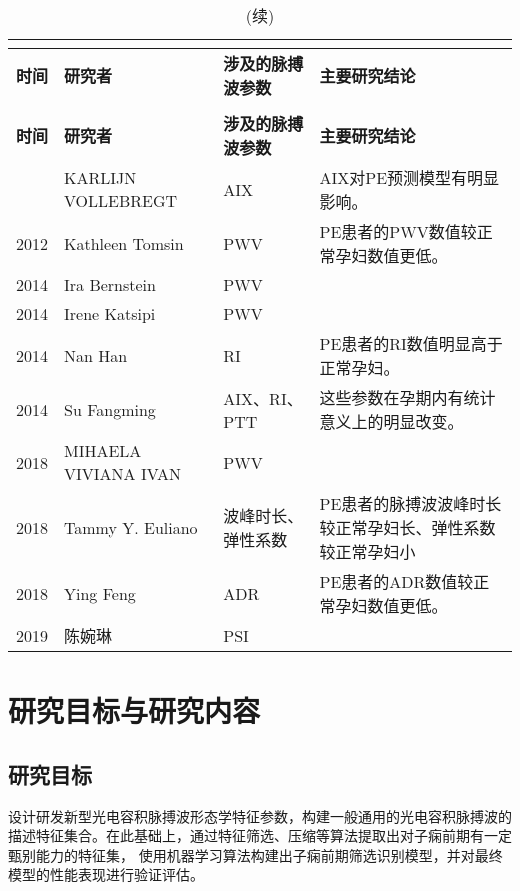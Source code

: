 \begin{center}
	\begin{longtable}{m{1cm}<{\centering}m{3cm}<{\centering}m{3cm}<{\centering}m{7cm}<{\centering}}
		\caption{基于脉搏波的PE研究小结}\\
		\label{tab:PPGinPE}\\
        \toprule
        \textbf{时间}&\textbf{研究者}&\textbf{涉及的脉搏波参数}&\textbf{主要研究结论}\\
        \midrule
        \endfirsthead
        \caption[]{(续)}\\
        \midrule
        \textbf{时间}&\textbf{研究者}&\textbf{涉及的脉搏波参数}&\textbf{主要研究结论}\\
        \midrule
        \endhead 
        \midrule
        \endfoot
        \bottomrule
        \endlastfoot
        2008    &   KARLIJN VOLLEBREGT\cite{KARLIJN2008}    &   AIX     &   AIX对PE预测模型有明显影响。\\
        2012    &   Kathleen Tomsin\cite{Tomsin2012}    &   PWV     &   PE患者的PWV数值较正常孕妇数值更低。 \\
        2014    &   Ira Bernstein\cite{Ira2014}     &   PWV &   \\
        2014    &   Irene Katsipi\cite{Katsipi2014}     &   PWV &   \\
        2014    &   Nan Han\cite{Han2014}     &   RI &  PE患者的RI数值明显高于正常孕妇。 \\
        2014    &   Su Fangming\cite{Su2014}    &   AIX、RI、PTT    &   这些参数在孕期内有统计意义上的明显改变。\\
        2018    &   MIHAELA VIVIANA IVAN\cite{VivianaIvan2018}     &   PWV &   \\
        2018    &   Tammy Y. Euliano\cite{Euliano2018}     &   波峰时长、弹性系数 &   PE患者的脉搏波波峰时长较正常孕妇长、弹性系数较正常孕妇小\\
        2018    &   Ying Feng\cite{Feng2018}    &   ADR &  PE患者的ADR数值较正常孕妇数值更低。 \\
        2019    &   陈婉琳\cite{Chen2019}     &   PSI &   \\
	\end{longtable}
\end{center}

\section{研究目标与研究内容}

\subsection{研究目标}
设计研发新型光电容积脉搏波形态学特征参数，构建一般通用的光电容积脉搏波的描述特征集合。在此基础上，通过特征筛选、压缩等算法提取出对子痫前期有一定甄别能力的特征集，
使用机器学习算法构建出子痫前期筛选识别模型，并对最终模型的性能表现进行验证评估。
